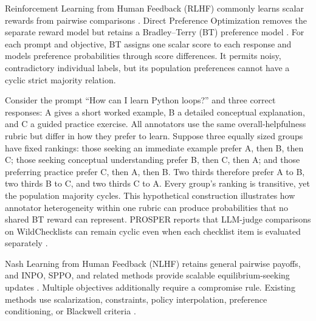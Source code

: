 \documentclass{article}
\theoremstyle{remark}
\theoremstyle{plain}
\begin{document}
Reinforcement Learning from Human Feedback (RLHF) commonly learns scalar rewards from pairwise comparisons \citep{christiano2017deep,ouyang2022training}. Direct Preference Optimization removes the separate reward model but retains a Bradley--Terry (BT) preference model \citep{rafailov2023direct,bradley1952rank}. For each prompt and objective, BT assigns one scalar score to each response and models preference probabilities through score differences. It permits noisy, contradictory individual labels, but its population preferences cannot have a cyclic strict majority relation.

Consider the prompt ``How can I learn Python loops?'' and three correct responses: A gives a short worked example, B a detailed conceptual explanation, and C a guided practice exercise. All annotators use the same overall-helpfulness rubric but differ in how they prefer to learn. Suppose three equally sized groups have fixed rankings: those seeking an immediate example prefer A, then B, then C; those seeking conceptual understanding prefer B, then C, then A; and those preferring practice prefer C, then A, then B. Two thirds therefore prefer A to B, two thirds B to C, and two thirds C to A. Every group's ranking is transitive, yet the population majority cycles. This hypothetical construction illustrates how annotator heterogeneity within one rubric can produce probabilities that no shared BT reward can represent. PROSPER reports that LLM-judge comparisons on WildChecklists can remain cyclic even when each checklist item is evaluated separately \citep{zhang2026prosper}.

Nash Learning from Human Feedback (NLHF) retains general pairwise payoffs, and INPO, SPPO, and related methods provide scalable equilibrium-seeking updates \citep{munos2024nash,zhang2025iterative,wu2025sppo,calandriello2024online,rosset2024direct,zhou2025egpo}. Multiple objectives additionally require a compromise rule. Existing methods use scalarization, constraints, policy interpolation, preference conditioning, or Blackwell criteria \citep{zhou2024beyond,rame2023rewarded,zhong2024panacea,agnihotri2026mopo,zhang2026prosper}.
\end{document}
